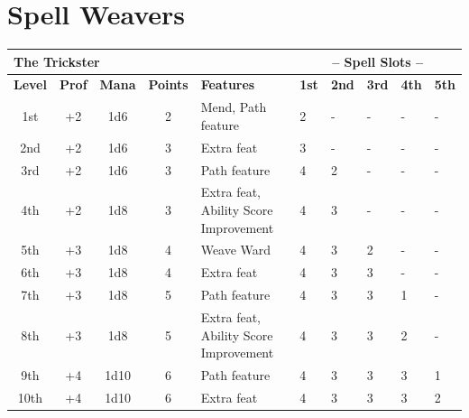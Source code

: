\chapter{Spell Weavers}




\begin{table}[ht!]
\begin{small}
\begin{center}
\begin{tabular}{ccccllllll}
\multicolumn{5}{l}{\parbox[l][0.6cm][c]{8cm}{\textbf{The Trickster}}} & 
\multicolumn{5}{c}{\textbf{-- Spell Slots --}}
\\
\hline 
\textbf{Level} & \textbf{Prof} & \textbf{Mana} & \textbf{Points} & \parbox[l][0.6cm][c]{8cm}{\textbf{Features}} & \textbf{1st} & \textbf{2nd} & \textbf{3rd} & \textbf{4th} & \textbf{5th}
\\ 
1st & +2 & 1d6 & 2 & \parbox[l][0.6cm][c]{8cm}{Mend, Path feature} & 2 & - & - & - & -
\\
2nd & +2 & 1d6 & 3 & \parbox[l][0.6cm][c]{8cm}{Extra feat} & 3 & - & - & - & -
\\
3rd & +2 & 1d6 & 3 & \parbox[l][0.6cm][c]{8cm}{Path feature} & 4 & 2 & -& - & -
\\
4th & +2 & 1d8 & 3 & \parbox[l][0.6cm][c]{8cm}{Extra feat, Ability Score Improvement} & 4 & 3 & - & - & -
\\
5th & +3 & 1d8 & 4 & \parbox[l][0.6cm][c]{8cm}{Weave Ward} & 4 & 3 & 2 & - & -
\\
6th & +3 & 1d8 & 4 & \parbox[l][0.6cm][c]{8cm}{Extra feat} & 4 & 3 & 3 & - & -
\\
7th & +3 & 1d8 & 5 & \parbox[l][0.6cm][c]{8cm}{Path feature} & 4 & 3 & 3 & 1 & -
\\
8th & +3 & 1d8 & 5 & \parbox[l][0.6cm][c]{8cm}{Extra feat, Ability Score Improvement} & 4 & 3 & 3 & 2 & -
\\
9th & +4 & 1d10 & 6 & \parbox[l][0.6cm][c]{8cm}{Path feature} & 4 & 3 & 3 & 3 & 1 
\\
10th & +4 & 1d10 & 6 & \parbox[l][0.6cm][c]{8cm}{Extra feat} & 4 & 3 & 3 & 3 & 2 
\\

\hline
\end{tabular}
\end{center}
\end{small}
\end{table}


